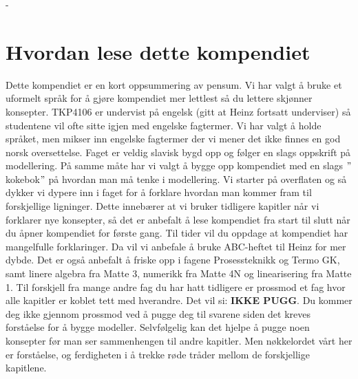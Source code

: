 \clearpage-
\section{Hvordan lese dette kompendiet}\label{sec:lese}
Dette kompendiet er en kort oppsummering av pensum. Vi har valgt å bruke et uformelt språk for å gjøre kompendiet mer lettlest så du lettere skjønner konsepter. TKP4106 er undervist på engelsk (gitt at Heinz fortsatt underviser) så studentene vil ofte sitte igjen med engelske fagtermer. Vi har valgt å holde språket, men  mikser inn engelske fagtermer der vi mener det ikke finnes en god norsk oversettelse. Faget er veldig slavisk bygd opp og følger en slags oppskrift på modellering. På samme måte har vi valgt å bygge opp kompendiet med en slags $"$kokebok$"$ på hvordan man må tenke i modellering. Vi starter på overflaten og så dykker vi dypere inn i faget for å forklare hvordan man kommer fram til forskjellige ligninger. Dette innebærer at vi bruker tidligere kapitler når vi forklarer nye konsepter, så det er anbefalt å lese kompendiet fra start til slutt når du åpner kompendiet for første gang. Til tider vil du oppdage at kompendiet har mangelfulle forklaringer. Da vil vi anbefale å bruke ABC-heftet til Heinz for mer dybde. Det er også anbefalt å friske opp i fagene Prosessteknikk og Termo GK, samt linere algebra fra Matte 3, numerikk fra Matte 4N og linearisering fra Matte 1. Til forskjell fra mange andre fag du har hatt tidligere er prossmod et fag hvor alle kapitler er koblet tett med hverandre. Det vil si: \textbf{IKKE PUGG}. Du kommer deg ikke gjennom prossmod ved å pugge deg til svarene siden det kreves forståelse for å bygge modeller. Selvfølgelig kan det hjelpe å pugge noen konsepter før man ser sammenhengen til andre kapitler. Men nøkkelordet vårt her er forståelse, og ferdigheten i å trekke røde tråder mellom de forskjellige kapitlene. 